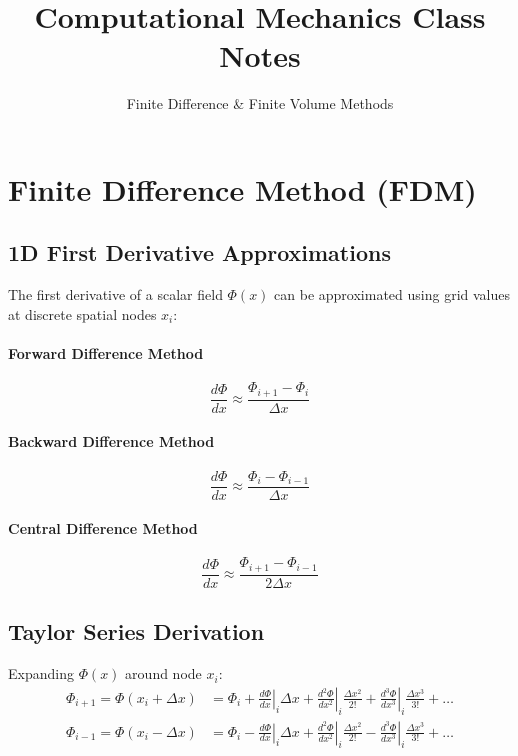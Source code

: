\documentclass{article}
\title{\textbf{Computational Mechanics Class Notes}}
\author{Finite Difference \& Finite Volume Methods}
\date{}
\begin{document}
\maketitle

\section{Finite Difference Method (FDM)}

\subsection{1D First Derivative Approximations}

The first derivative of a scalar field $\Phi(x)$ can be approximated using grid values at discrete spatial nodes $x_i$:

\paragraph{Forward Difference Method}
\begin{equation}
    \frac{d\Phi}{dx} \approx \frac{\Phi_{i+1} - \Phi_i}{\Delta x}
\end{equation}

\paragraph{Backward Difference Method}
\begin{equation}
    \frac{d\Phi}{dx} \approx \frac{\Phi_i - \Phi_{i-1}}{\Delta x}
\end{equation}

\paragraph{Central Difference Method}
\begin{equation}
    \frac{d\Phi}{dx} \approx \frac{\Phi_{i+1} - \Phi_{i-1}}{2\Delta x}
\end{equation}

\subsection{Taylor Series Derivation}

Expanding $\Phi(x)$ around node $x_i$:
\begin{align}
    \Phi_{i+1} = \Phi(x_i + \Delta x) & = \Phi_i + \left.\frac{d\Phi}{dx}\right|_i \Delta x + \left.\frac{d^2\Phi}{dx^2}\right|_i \frac{\Delta x^2}{2!} + \left.\frac{d^3\Phi}{dx^3}\right|_i \frac{\Delta x^3}{3!} + \dots \\
    \Phi_{i-1} = \Phi(x_i - \Delta x) & = \Phi_i - \left.\frac{d\Phi}{dx}\right|_i \Delta x + \left.\frac{d^2\Phi}{dx^2}\right|_i \frac{\Delta x^2}{2!} - \left.\frac{d^3\Phi}{dx^3}\right|_i \frac{\Delta x^3}{3!} + \dots
\end{align}
\end{document}

